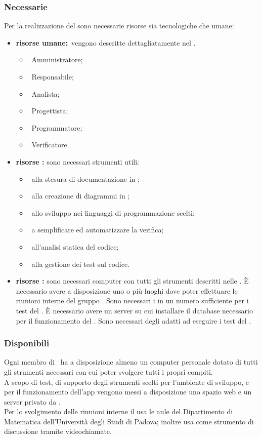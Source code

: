 		\subsubsection{Necessarie}
			Per la realizzazione del  sono necessarie risorse sia tecnologiche che umane:
			\begin{itemize}
				\item \textbf{risorse umane:}\ vengono descritte dettagliatamente nel \PPdoc.
				\begin{itemize}
					\item\ Amministratore;
					\item\ Responsabile;
					\item\ Analista;
					\item\ Progettista;
					\item\ Programmatore;
					\item\ Verificatore.
				\end{itemize}
				\item \textbf{risorse :} sono necessari strumenti  utili:
				\begin{itemize}
					\item\ alla stesura di documentazione in ;
					\item\ alla creazione di diagrammi in ;
					\item\ allo sviluppo nei linguaggi di programmazione scelti;
					\item\ a semplificare ed automatizzare la verifica;
					\item\ all'analisi statica del codice;
					\item\ alla gestione dei test sul codice.
				\end{itemize}
				\item \textbf{risorse :} sono necessari computer con tutti gli strumenti  descritti nelle \NPdoc. È necessario avere a disposizione uno o più luoghi dove poter effettuare le riunioni interne del gruppo \AUTORE. Sono necessari i  in un numero sufficiente per i test del . È necessario avere un server su cui installare il database necessario per il funzionamento del . Sono necessari degli  adatti ad eseguire i test del .
			\end{itemize}
		\subsubsection{Disponibili}
			Ogni membro di \AUTORE\ ha a disposizione almeno un computer personale dotato di tutti gli strumenti necessari con cui poter svolgere tutti i propri compiti. \\
			A scopo di test, di supporto degli strumenti scelti per l'ambiente di sviluppo, e per il funzionamento dell'app vengono messi a disposizione uno spazio web e un server privato da \PROPONENTE. \\
			Per lo svolgimento delle riunioni interne il  usa le aule del Dipartimento di Matematica dell'Università degli Studi di Padova; inoltre usa  come strumento di discussione tramite videochiamate.

